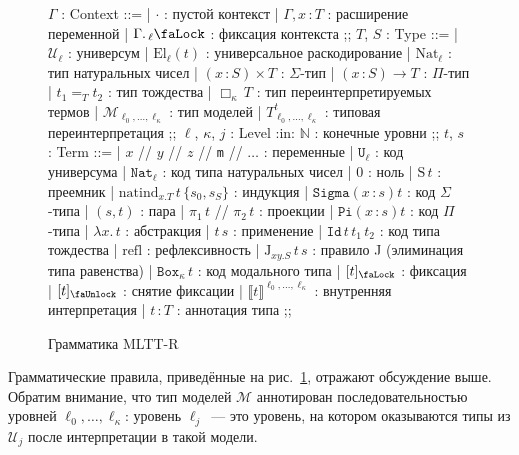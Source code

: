 \begin{figure}
    \centering
    \begin{bnf}
        $\Gamma$ : Context ::=
        | $\cdot$ : пустой контекст
        | $\Gamma,x\,\colon T$ : расширение переменной
        | $\Gamma.\,{}_\ell\text{\faLock}$
        : фиксация контекста
        ;;
        $T$, $S$ : Type ::=
        | $\mathcal{U}_\ell$ : универсум
        | $\mathrm{El}_\ell(t)$
        : универсальное раскодирование
        | $\mathrm{Nat}_\ell$ : тип натуральных чисел
        | $(x\,\colon S)\times T$ : $\Sigma$-тип
        | $(x\,\colon S)\to T$ : $\Pi$-тип
        | $t_1=_T t_2$ : тип тождества
        | $\Box_\kappa\,T$
        : тип переинтерпретируемых термов
        | $\mathcal{M}_{\ell_0,\ldots,\ell_\kappa}$
        : тип моделей
        | $T^t_{\ell_0,\ldots,\ell_\kappa}$
        : типовая переинтерпретация
        ;;
        $\ell$, $\kappa$, $j$ : Level :in: $\mathbb{N}$
        : конечные уровни ;;
        $t$, $s$ : Term ::=
        | $x$ // $y$ // $z$ // \texttt{m} // $\ldots$
        : переменные
        | $\mathtt{U}_\ell$ : код универсума
        | $\mathtt{Nat}_\ell$
        : код типа натуральных чисел
        | $0$ : ноль
        | $\mathrm{S}\,t$ : преемник
        | $\mathrm{natind}_{x.T}\,t\,\{s_0,s_S\}$
        : индукция
        | $\mathtt{Sigma}(x\,\colon s)t$
        : код $\Sigma$-типа
        | $(s, t)$ : пара
        | $\pi_1\,t$ // $\pi_2\,t$ : проекции
        | $\mathtt{Pi}(x\,\colon s)t$
        : код $\Pi$-типа
        | $\lambda x.\,t$ : абстракция
        | $t\,s$ : применение
        | $\mathtt{Id}\,t\,t_1\,t_2$
        : код типа тождества
        | $\mathrm{refl}$ : рефлексивность
        | $\mathrm{J}_{xy.S}\,t\,s$
        : правило J (элиминация типа равенства)
        | $\mathtt{Box}_\kappa\,t$
        : код модального типа
        | $[t]_\text{\faLock}$ : фиксация
        | $[t]_\text{\faUnlock}$ : снятие фиксации
        | $\llbracket t
        \rrbracket^{\ell_0,\ldots,\ell_\kappa}$
        : внутренняя интерпретация
        | $t\,\colon T$ : аннотация типа
        ;;
    \end{bnf}
    \caption{Грамматика MLTT-R}
    \label{mltt-r-grammar}
\end{figure}

Грамматические правила, приведённые на
рис.~\ref{mltt-r-grammar}, отражают обсуждение выше.
Обратим внимание, что тип моделей $\mathcal{M}$
аннотирован последовательностью уровней
$\ell_0,\ldots,\ell_\kappa$: уровень $\ell_j$~--- это
уровень, на котором оказываются типы из $\mathcal{U}_j$
после интерпретации в такой модели.

